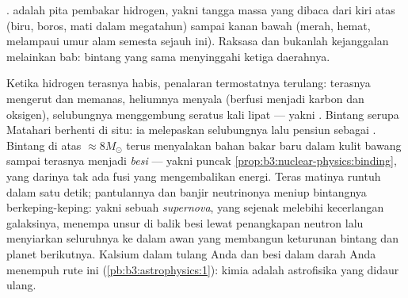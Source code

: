 \begin{omfigure}

{\small {}.  adalah pita
pembakar hidrogen, yakni tangga massa yang dibaca dari kiri atas (biru,
boros, mati dalam megatahun) sampai kanan bawah (merah, hemat,
melampaui umur alam semesta sejauh ini). Raksasa dan  bukanlah
kejanggalan melainkan bab: bintang yang sama menyinggahi ketiga daerahnya.}
\end{omfigure}

\begin{remark}\label{rem:b3:astrophysics:evolution}
Ketika hidrogen terasnya habis, penalaran termostatnya terulang:
terasnya mengerut dan memanas, heliumnya menyala (berfusi menjadi karbon
dan oksigen), selubungnya menggembung seratus kali lipat --- yakni .
Bintang serupa Matahari berhenti di situ: ia melepaskan selubungnya lalu pensiun
sebagai . Bintang di atas $\approx8M_\odot$ terus menyalakan
bahan bakar baru dalam kulit bawang sampai terasnya menjadi \emph{besi} ---
yakni puncak \cref{prop:b3:nuclear-physics:binding}, yang darinya tak ada
fusi yang mengembalikan energi. Teras matinya runtuh dalam satu detik;
pantulannya dan banjir neutrinonya meniup bintangnya berkeping-keping: yakni sebuah
\emph{supernova}, yang sejenak melebihi kecerlangan galaksinya, menempa
unsur di balik besi lewat penangkapan neutron lalu menyiarkan seluruhnya
ke dalam awan yang membangun keturunan bintang dan planet berikutnya. Kalsium
dalam tulang Anda dan besi dalam darah Anda menempuh rute ini
(\cref{pb:b3:astrophysics:1}): kimia adalah astrofisika
yang didaur ulang.
\end{remark}

